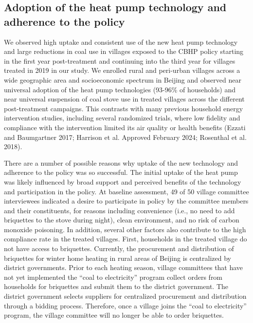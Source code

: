 \documentclass[
  letterpaper,
  DIV=11,
  numbers=noendperiod]{scrartcl}
\begin{document}
\hypertarget{adoption-of-the-heat-pump-technology-and-adherence-to-the-policy}{%
\subsection{Adoption of the heat pump technology and adherence to the
policy}\label{adoption-of-the-heat-pump-technology-and-adherence-to-the-policy}}

We observed high uptake and consistent use of the new heat pump
technology and large reductions in coal use in villages exposed to the
CBHP policy starting in the first year post-treatment and continuing
into the third year for villages treated in 2019 in our study. We
enrolled rural and peri-urban villages across a wide geographic area and
socioeconomic spectrum in Beijing and observed near universal adoption
of the heat pump technologies (93-96\% of households) and near universal
suspension of coal stove use in treated villages across the different
post-treatment campaigns. This contrasts with many previous household
energy intervention studies, including several randomized trials, where
low fidelity and compliance with the intervention limited its air
quality or health benefits (Ezzati and Baumgartner 2017; Harrison et al.
Approved February 2024; Rosenthal et al. 2018).

There are a number of possible reasons why uptake of the new technology
and adherence to the policy was so successful. The initial uptake of the
heat pump was likely influenced by broad support and perceived benefits
of the technology and participation in the policy. At baseline
assessment, 49 of 50 village committee interviewees indicated a desire
to participate in policy by the committee members and their
constituents, for reasons including convenience (i.e., no need to add
briquettes to the stove during night), clean environment, and no risk of
carbon monoxide poisoning. In addition, several other factors also
contribute to the high compliance rate in the treated villages. First,
households in the treated village do not have access to briquettes.
Currently, the procurement and distribution of briquettes for winter
home heating in rural areas of Beijing is centralized by district
governments. Prior to each heating season, village committees that have
not yet implemented the ``coal to electricity'' program collect orders
from households for briquettes and submit them to the district
government. The district government selects suppliers for centralized
procurement and distribution through a bidding process. Therefore, once
a village joins the ``coal to electricity'' program, the village
committee will no longer be able to order briquettes.
\end{document}
